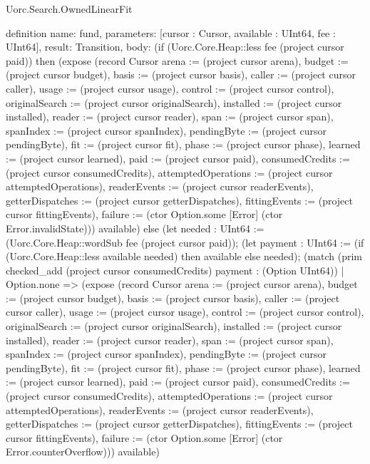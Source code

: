 \begin{lexlean}{Uorc.Search.OwnedLinearFit}
\begin{semanticmodule}
definition{
  name: fund,
  parameters: [cursor : Cursor, available : UInt64, fee : UInt64],
  result: Transition,
  body: (if (Uorc.Core.Heap::less fee (project cursor paid)) then (expose (record Cursor {arena := (project cursor arena), budget := (project cursor budget), basis := (project cursor basis), caller := (project cursor caller), usage := (project cursor usage), control := (project cursor control), originalSearch := (project cursor originalSearch), installed := (project cursor installed), reader := (project cursor reader), span := (project cursor span), spanIndex := (project cursor spanIndex), pendingByte := (project cursor pendingByte), fit := (project cursor fit), phase := (project cursor phase), learned := (project cursor learned), paid := (project cursor paid), consumedCredits := (project cursor consumedCredits), attemptedOperations := (project cursor attemptedOperations), readerEvents := (project cursor readerEvents), getterDispatches := (project cursor getterDispatches), fittingEvents := (project cursor fittingEvents), failure := (ctor Option.some [Error] (ctor Error.invalidState))}) available) else (let needed : UInt64 := (Uorc.Core.Heap::wordSub fee (project cursor paid)); (let payment : UInt64 := (if (Uorc.Core.Heap::less available needed) then available else needed); (match (prim checked_add (project cursor consumedCredits) payment : (Option UInt64))
    | Option.none => (expose (record Cursor {arena := (project cursor arena), budget := (project cursor budget), basis := (project cursor basis), caller := (project cursor caller), usage := (project cursor usage), control := (project cursor control), originalSearch := (project cursor originalSearch), installed := (project cursor installed), reader := (project cursor reader), span := (project cursor span), spanIndex := (project cursor spanIndex), pendingByte := (project cursor pendingByte), fit := (project cursor fit), phase := (project cursor phase), learned := (project cursor learned), paid := (project cursor paid), consumedCredits := (project cursor consumedCredits), attemptedOperations := (project cursor attemptedOperations), readerEvents := (project cursor readerEvents), getterDispatches := (project cursor getterDispatches), fittingEvents := (project cursor fittingEvents), failure := (ctor Option.some [Error] (ctor Error.counterOverflow))}) available)
}
\end{semanticmodule}
\end{lexlean}
